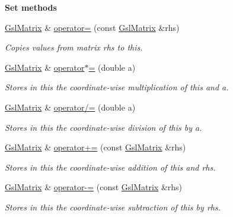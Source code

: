 \begin{Indent}{\bf Set methods}\par
\begin{DoxyCompactItemize}
\item 
\hyperlink{class_q_u_e_s_o_1_1_gsl_matrix}{Gsl\-Matrix} \& \hyperlink{class_q_u_e_s_o_1_1_gsl_matrix_a5763769cb3844db2b1c00da0541f02ce}{operator=} (const \hyperlink{class_q_u_e_s_o_1_1_gsl_matrix}{Gsl\-Matrix} \&rhs)
\begin{DoxyCompactList}\small\item\em Copies values from matrix {\ttfamily rhs} to {\ttfamily this}. \end{DoxyCompactList}\item 
\hyperlink{class_q_u_e_s_o_1_1_gsl_matrix}{Gsl\-Matrix} \& \hyperlink{class_q_u_e_s_o_1_1_gsl_matrix_a50d643ef1b66a9ae881a1324db819c7f}{operator$\ast$=} (double a)
\begin{DoxyCompactList}\small\item\em Stores in {\ttfamily this} the coordinate-\/wise multiplication of {\ttfamily this} and {\ttfamily a}. \end{DoxyCompactList}\item 
\hyperlink{class_q_u_e_s_o_1_1_gsl_matrix}{Gsl\-Matrix} \& \hyperlink{class_q_u_e_s_o_1_1_gsl_matrix_a877138bc19abbfa1a7e34483390a6b01}{operator/=} (double a)
\begin{DoxyCompactList}\small\item\em Stores in {\ttfamily this} the coordinate-\/wise division of {\ttfamily this} by {\ttfamily a}. \end{DoxyCompactList}\item 
\hyperlink{class_q_u_e_s_o_1_1_gsl_matrix}{Gsl\-Matrix} \& \hyperlink{class_q_u_e_s_o_1_1_gsl_matrix_a1b7b1c34495dc6bdcac9e77b95c0bfe0}{operator+=} (const \hyperlink{class_q_u_e_s_o_1_1_gsl_matrix}{Gsl\-Matrix} \&rhs)
\begin{DoxyCompactList}\small\item\em Stores in {\ttfamily this} the coordinate-\/wise addition of {\ttfamily this} and {\ttfamily rhs}. \end{DoxyCompactList}\item 
\hyperlink{class_q_u_e_s_o_1_1_gsl_matrix}{Gsl\-Matrix} \& \hyperlink{class_q_u_e_s_o_1_1_gsl_matrix_a31fb35bf5eeafc45c0dfd7ec447f3a71}{operator-\/=} (const \hyperlink{class_q_u_e_s_o_1_1_gsl_matrix}{Gsl\-Matrix} \&rhs)
\begin{DoxyCompactList}\small\item\em Stores in {\ttfamily this} the coordinate-\/wise subtraction of {\ttfamily this} by {\ttfamily rhs}. \end{DoxyCompactList}\end{DoxyCompactItemize}
\end{Indent}
